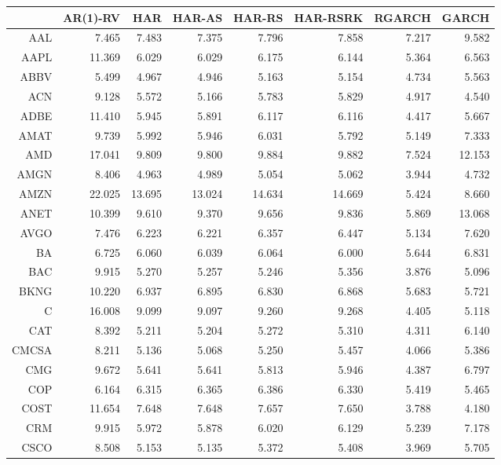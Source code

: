 \begin{table}[ht]
\centering
\begin{tabular}{rrrrrrrr}
  \hline
 & AR(1)-RV & HAR & HAR-AS & HAR-RS & HAR-RSRK & RGARCH & GARCH \\ 
  \hline
AAL & 7.465 & 7.483 & 7.375 & 7.796 & 7.858 & 7.217 & 9.582 \\ 
  AAPL & 11.369 & 6.029 & 6.029 & 6.175 & 6.144 & 5.364 & 6.563 \\ 
  ABBV & 5.499 & 4.967 & 4.946 & 5.163 & 5.154 & 4.734 & 5.563 \\ 
  ACN & 9.128 & 5.572 & 5.166 & 5.783 & 5.829 & 4.917 & 4.540 \\ 
  ADBE & 11.410 & 5.945 & 5.891 & 6.117 & 6.116 & 4.417 & 5.667 \\ 
  AMAT & 9.739 & 5.992 & 5.946 & 6.031 & 5.792 & 5.149 & 7.333 \\ 
  AMD & 17.041 & 9.809 & 9.800 & 9.884 & 9.882 & 7.524 & 12.153 \\ 
  AMGN & 8.406 & 4.963 & 4.989 & 5.054 & 5.062 & 3.944 & 4.732 \\ 
  AMZN & 22.025 & 13.695 & 13.024 & 14.634 & 14.669 & 5.424 & 8.660 \\ 
  ANET & 10.399 & 9.610 & 9.370 & 9.656 & 9.836 & 5.869 & 13.068 \\ 
  AVGO & 7.476 & 6.223 & 6.221 & 6.357 & 6.447 & 5.134 & 7.620 \\ 
  BA & 6.725 & 6.060 & 6.039 & 6.064 & 6.000 & 5.644 & 6.831 \\ 
  BAC & 9.915 & 5.270 & 5.257 & 5.246 & 5.356 & 3.876 & 5.096 \\ 
  BKNG & 10.220 & 6.937 & 6.895 & 6.830 & 6.868 & 5.683 & 5.721 \\ 
  C & 16.008 & 9.099 & 9.097 & 9.260 & 9.268 & 4.405 & 5.118 \\ 
  CAT & 8.392 & 5.211 & 5.204 & 5.272 & 5.310 & 4.311 & 6.140 \\ 
  CMCSA & 8.211 & 5.136 & 5.068 & 5.250 & 5.457 & 4.066 & 5.386 \\ 
  CMG & 9.672 & 5.641 & 5.641 & 5.813 & 5.946 & 4.387 & 6.797 \\ 
  COP & 6.164 & 6.315 & 6.365 & 6.386 & 6.330 & 5.419 & 5.465 \\ 
  COST & 11.654 & 7.648 & 7.648 & 7.657 & 7.650 & 3.788 & 4.180 \\ 
  CRM & 9.915 & 5.972 & 5.878 & 6.020 & 6.129 & 5.239 & 7.178 \\ 
  CSCO & 8.508 & 5.153 & 5.135 & 5.372 & 5.408 & 3.969 & 5.705 \\ 

\end{tabular}
\end{table}
